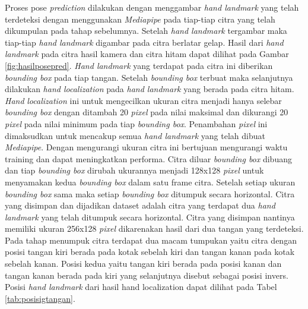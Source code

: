 Proses pose \emph{prediction} dilakukan dengan menggambar \emph{hand landmark} yang telah terdeteksi dengan menggunakan \emph{Mediapipe} pada tiap-tiap citra yang telah dikumpulan pada tahap sebelumnya. Setelah \emph{hand landmark} tergambar maka tiap-tiap \emph{hand landmark} digambar pada citra berlatar gelap. Hasil dari \emph{hand landmark} pada citra hasil kamera dan citra hitam dapat dilihat pada Gambar \ref{fig:hasilposepred}. \emph{Hand landmark} yang terdapat pada citra ini diberikan \emph{bounding box} pada tiap tangan. Setelah \emph{bounding box} terbuat maka selanjutnya dilakukan \emph{hand localization} pada \emph{hand landmark} yang berada pada citra hitam. \emph{Hand} \emph{localization} ini untuk mengecilkan ukuran citra menjadi hanya selebar \emph{bounding box} dengan ditambah 20 \emph{pixel} pada nilai maksimal dan dikurangi 20 \emph{pixel} pada nilai minimum pada tiap \emph{bounding box}. Penambahan \emph{pixel} ini dimaksudkan untuk mencakup semua \emph{hand landmark} yang telah dibuat \emph{Mediapipe}. Dengan mengurangi ukuran citra ini bertujuan mengurangi waktu training dan dapat meningkatkan performa. Citra diluar \emph{bounding box} dibuang dan tiap \emph{bounding box} dirubah ukurannya menjadi 128x128 \emph{pixel} untuk menyamakan kedua \emph{bounding box} dalam satu frame citra. Setelah setiap ukuran \emph{bounding box} sama maka setiap \emph{bounding box} ditumpuk secara horizontal. Citra yang disimpan dan dijadikan dataset adalah citra yang terdapat dua \emph{hand landmark} yang telah ditumpuk secara horizontal. Citra yang disimpan nantinya memiliki ukuran 256x128 \emph{pixel} dikarenakan hasil dari dua tangan yang terdeteksi. Pada tahap menumpuk citra terdapat dua macam tumpukan yaitu citra dengan posisi tangan kiri berada pada kotak sebelah kiri dan tangan kanan pada kotak sebelah kanan. Posisi kedua yaitu tangan kiri berada pada posisi kanan dan tangan kanan berada pada kiri yang selanjutnya disebut sebagai posisi invers. Posisi \emph{hand landmark} dari hasil hand localization dapat dilihat pada Tabel \ref{tab:posisigtangan}.

